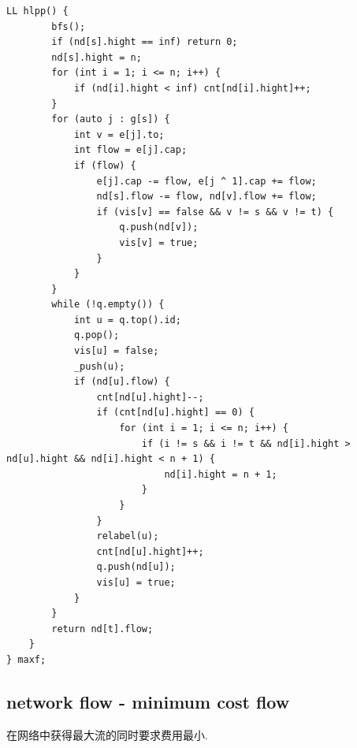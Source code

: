 \documentclass[UTF8, a4paper, titlepage, twoside]{ctexart}
\begin{document}
\begin{lstlisting}[style=cpp]
    LL hlpp() {
        bfs();
        if (nd[s].hight == inf) return 0;
        nd[s].hight = n;
        for (int i = 1; i <= n; i++) {
            if (nd[i].hight < inf) cnt[nd[i].hight]++;
        }
        for (auto j : g[s]) {
            int v = e[j].to;
            int flow = e[j].cap;
            if (flow) {
                e[j].cap -= flow, e[j ^ 1].cap += flow;
                nd[s].flow -= flow, nd[v].flow += flow;
                if (vis[v] == false && v != s && v != t) {
                    q.push(nd[v]);
                    vis[v] = true;
                }
            }
        }
        while (!q.empty()) {
            int u = q.top().id;
            q.pop();
            vis[u] = false;
            _push(u);
            if (nd[u].flow) {
                cnt[nd[u].hight]--;
                if (cnt[nd[u].hight] == 0) {
                    for (int i = 1; i <= n; i++) {
                        if (i != s && i != t && nd[i].hight > nd[u].hight && nd[i].hight < n + 1) {
                            nd[i].hight = n + 1;
                        }
                    }
                }
                relabel(u);
                cnt[nd[u].hight]++;
                q.push(nd[u]);
                vis[u] = true;
            }
        }
        return nd[t].flow;
    }
} maxf;
\end{lstlisting}

\subsection{ network flow - minimum cost flow }
在网络中获得最大流的同时要求费用最小.
\end{document}
